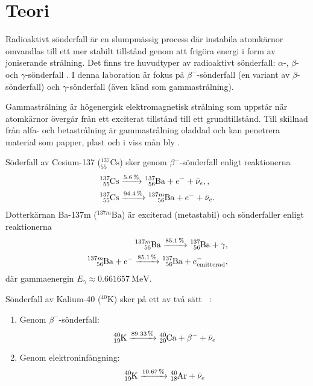 \section{Teori} \label{sec:theory}

Radioaktivt sönderfall är en slumpmässig process där instabila atomkärnor
omvandlas till ett mer stabilt tillstånd genom att frigöra energi i form av
joniserande strålning. Det finns tre huvudtyper av radioaktivt sönderfall:
$\alpha$-, $\beta$- och $\gamma$-sönderfall \parencite{yf}. I denna laboration
är fokus på $\beta^-$-sönderfall (en variant av $\beta$-sönderfall) och
$\gamma$-sönderfall (även känd som gammastrålning).

Gammastrålning är högenergisk elektromagnetisk strålning som uppstår när
atomkärnor övergår från ett exciterat tillstånd till ett grundtillstånd. Till
skillnad från alfa- och betastrålning är gammastrålning oladdad och kan
penetrera material som papper, plast och i viss mån bly
\parencite{spectrometry}.

Söderfall av Cesium-137 ($^{137}_{55}\text{Cs}$) sker genom
$\beta^-$-sönderfall enligt reaktionerna
%
\begin{align}
    \ce{^137_55Cs} &\xrightarrow{\qty{5.6}{\percent}}  \ce{^137_56Ba} + e^- + \bar{\nu}_e,   \label{eq:csdecay1}, \\
    \ce{^137_55Cs} &\xrightarrow{\qty{94.4}{\percent}} \ce{^{137m}_56Ba} + e^- + \bar{\nu}_e \label{eq:csdecay2}.
\end{align}
%
Dotterkärnan Ba-137m ($^{137m}\text{Ba}$) är exciterad (metastabil) och
sönderfaller enligt reaktionerna
%
\begin{align}
    \ce{^{137m}_56Ba} \xrightarrow{\qty{85.1}{\percent}} \ce{^137_56Ba} + \gamma                     \label{eq:badecay1}, \\
    \ce{^{137m}_56Ba} + e^- \xrightarrow{\qty{85.1}{\percent}} \ce{^137_56Ba} + e^-_\text{emitterad} \label{eq:badecay2},
\end{align}
%
där gammaenergin $E_\gamma \approx \qty{0.661657}{\MeV}$.

Sönderfall av Kalium-40 ($^{40}\text{K}$) sker på ett av två sätt
\parencite{nuclear}~\parencite{instructions}:
%
\begin{enumerate}
    \item Genom $\beta^-$-sönderfall:
    \begin{equation}
        \ce{^40_19K} \xrightarrow{\qty{89.33}{\percent}} \ce{^40_20Ca} + \beta^- + \bar{\nu}_e \label{eq:kdecay1}
    \end{equation}

    \item Genom elektroninfångning:
    \begin{equation}
        \ce{^40_19K} \xrightarrow{\qty{10.67}{\percent}} \ce{^40_18Ar} + \bar{\nu}_e           \label{eq:kdecay2}
    \end{equation}
\end{enumerate}

